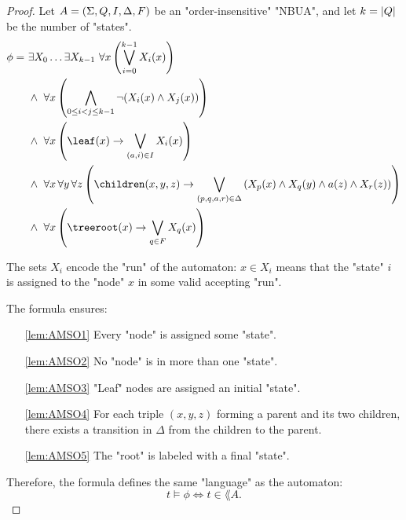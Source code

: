 \documentclass[a4paper,UKenglish,cleveref, autoref, thm-restate]{lipics-v2021}
\begin{document}
\begin{proof}\label{lem:Aut-to-MSO}
	Let $A = (\Sigma, Q, I, \Delta, F)$ be an "order-insensitive" "NBUA", and let $k = \left|Q\right|$ be the number of "states".
	\begin{align}
		\phi =\  & \exists X_0 \ldots \exists X_{k-1} \ \forall x \left( \bigvee_{i=0}^{k-1} X_i(x) \right) \label{lem:AMSO1}                                                                                    \\
		         & \land\ \forall x \left( \bigwedge_{0 \leq i < j \leq k-1} \lnot (X_i(x) \land X_j(x)) \right) \label{lem:AMSO2}                                                                               \\
		         & \land\ \forall x \left( \leaf(x) \rightarrow \bigvee_{(a,i) \in I} X_i(x) \right) \label{lem:AMSO3}                                                                                           \\
		         & \land\ \forall x\, \forall y\, \forall z \left(\children(x,y,z) \rightarrow \bigvee_{(p,q,a,r) \in \Delta} \left(X_p(x) \land X_q(y) \land a(z) \land X_r(z)\right) \right) \label{lem:AMSO4} \\
		         & \land\ \forall x \left( \treeroot(x) \rightarrow \bigvee_{q \in F} X_q(x) \right) \label{lem:AMSO5}
	\end{align}

	The sets $X_i$ encode the "run" of the automaton: $x \in X_i$ means that the "state" $i$ is assigned to the "node" $x$ in some valid accepting "run".

	The formula ensures:

	\begin{itemize}
		\item[\ref{lem:AMSO1}] Every "node" is assigned some "state".
		\item[\ref{lem:AMSO2}] No "node" is in more than one "state".
		\item[\ref{lem:AMSO3}] "Leaf" nodes are assigned an initial "state".
		\item[\ref{lem:AMSO4}] For each triple $(x,y,z)$ forming a parent and its two children,
		      there exists a transition in $\Delta$ from the children to the parent.
		\item[\ref{lem:AMSO5}] The "root" is labeled with a final "state".
	\end{itemize}

	Therefore, the formula defines the same "language" as the automaton:
	\[
		t \models \phi \iff t \in \lang A.
	\]
\end{proof}
\end{document}
